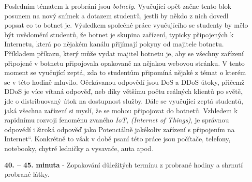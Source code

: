 \documentclass[a4paper, 12pt]{article}
\providecommand{\uv}[1]{\quotedblbase #1\textquotedblleft}
\begin{document}
Posledním tématem k probrání jsou \textit{botnety}. Vyučující opět začne tento blok posunem na nový snímek a dotazem studentů, jestli by někdo z nich dovedl popsat co to botnet je. Výsledkem společné práce vyučujícího se studenty by mělo být uvědomění studentů, že botnet je skupina zařízení, typicky připojených k Internetu, která po nějakém kanálu přijímají pokyny od majitele botnetu. Příkladem příkazu, který může vydat majitel botnetu je, aby se všechny zařízení připojené v botnetu připojovala opakovaně na nějakou webovou stránku. V tento moment se vyučující zeptá, zda to studentům připomíná nějaké z témat o kterém se v této hodině mluvilo. Očekávanou odpovědí jsou DoS a DDoS útoky, přičemž DDoS je více vítaná odpověď, neb díky většímu počtu reálných klientů po světě, jde o distribuovaný útok na dostupnost služby. Dále se vyučující zeptá studentů, jaká všechna zařízení si myslí, že se mohou připojovat do botnetů. Vzhledem k rapidnímu rozvoji fenoménu zvaného \textit{IoT, (Internet of Things)}, je správnou odpovědí i široká odpověď jako \uv{Potenciálně jakékoliv zařízení s připojením na Internet}. Konkrétně to však v době psaní této práce jsou počítače, telefony, notebooky, chytré ledničky a vysavače, auta apod.

\textbf{40. -- 45. minuta} - Zopakování důležitých termínu z probrané hodiny a shrnutí probrané látky.


\end{document}
